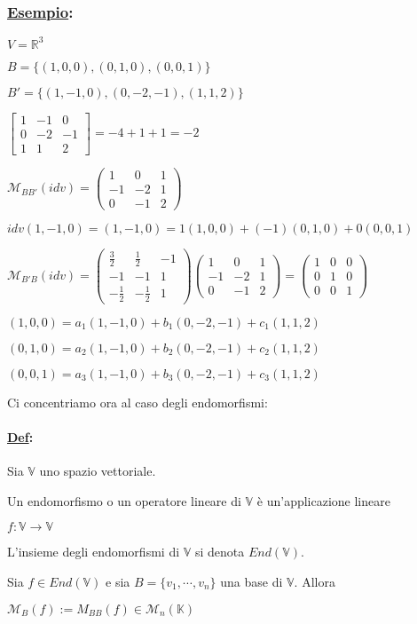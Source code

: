 \documentclass{article}
\newcommand{\ul}[1]{\underline{#1}}
\newcommand{\K}{\mathbb{K}}
\newcommand{\R}{\mathbb{R}}
\newcommand{\V}{\mathbb{V}}
\newcommand{\M}{\mathcal{M}}
\newcommand{\Def}[2]{\paragraph{\ul{Def}:}#1\\\hspace*{3em}\begin{minipage}{.8\textwidth}#2\end{minipage}}
\newcommand{\Esempio}[1]{\subsubsection*{\ul{Esempio}:}#1}
\begin{document}
	\Esempio{
		$V=\R^3$

		$B=\{(1,0,0),(0,1,0),(0,0,1)\}$

		$B'=\{(1,-1,0),(0,-2,-1),(1,1,2)\}$

		$\begin{bmatrix}
				1 & -1 & 0  \\
				0 & -2 & -1 \\
				1 & 1  & 2
			\end{bmatrix}=-4+1+1=-2$

		$\M_{BB'}(idv)=\begin{pmatrix}
				1  & 0  & 1 \\
				-1 & -2 & 1 \\
				0  & -1 & 2
			\end{pmatrix}$

		$idv(1,-1,0)=(1,-1,0)=1(1,0,0)+(-1)(0,1,0)+0(0,0,1)$

		$\M_{B'B}(idv)=\begin{pmatrix}
				\frac{3}{2}  & \frac{1}{2}  & -1 \\
				-1           & -1           & 1  \\
				-\frac{1}{2} & -\frac{1}{2} & 1
			\end{pmatrix}\begin{pmatrix}
				1  & 0  & 1 \\
				-1 & -2 & 1 \\
				0  & -1 & 2
			\end{pmatrix}=\begin{pmatrix}
				1 & 0 & 0 \\
				0 & 1 & 0 \\
				0 & 0 & 1
			\end{pmatrix}$

		$(1,0,0)=a_1(1,-1,0)+b_1(0,-2,-1)+c_1(1,1,2)$

		$(0,1,0)=a_2(1,-1,0)+b_2(0,-2,-1)+c_2(1,1,2)$

		$(0,0,1)=a_3(1,-1,0)+b_3(0,-2,-1)+c_3(1,1,2)$
	}

	Ci concentriamo ora al caso degli endomorfismi:
	\Def{Sia $\V$ uno spazio vettoriale.}{
		Un endomorfismo o un operatore lineare di $\V$ è un'applicazione lineare

		$f:\V\rightarrow\V$

		L'insieme degli endomorfismi di $\V$ si denota $End(\V)$.
	}

	Sia $f\in End(\V)$ e sia $B=\{v_1,\cdots,v_n\}$ una base di $\V$. Allora

$\M_B(f):=M_{BB}(f)\in\M_n(\K)$
\end{document}
